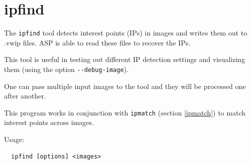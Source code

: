 \clearpage


\section{ipfind}
\label{ipfind}

The \texttt{ipfind} tool detects interest points (IPs) in images and writes them out to .vwip files.
ASP is able to read these files to recover the IPs.  

This tool is useful in testing out different IP detection settings and visualizing them (using the option \texttt{-\/-debug-image}).

One can pass multiple input images to the tool and they will be processed one after another.

This program works in conjunction with \texttt{ipmatch} (section \ref{ipmatch}) to match interest points across images.

Usage:
\begin{verbatim}
  ipfind [options] <images>
\end{verbatim}

